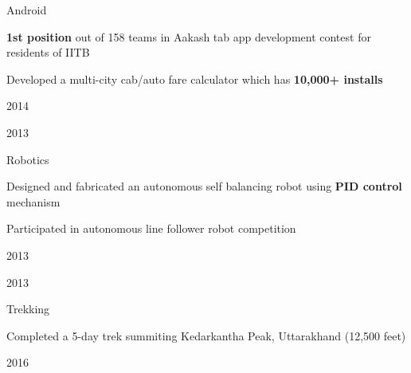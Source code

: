 \begin{fancyextracurrics}
%
%
\fancycurric
{Android}
{ %
\begin{extralistwithbullets}
\item {\textbf{1st position} out of 158 teams in Aakash tab app development contest for residents of IITB}
\item {Developed a multi-city cab/auto fare calculator which has \textbf{10,000+ installs}}
\end{extralistwithbullets}
}
{ %
\begin{extralistsansbullets}
\item {2014}
\item {2013}
\end{extralistsansbullets}
}
%
%
\fancycurric
{Robotics}
{ %
\begin{extralistwithbullets}
\item {Designed and fabricated an autonomous self balancing robot using \textbf{PID control} mechanism}
\item {Participated in autonomous line follower robot competition}
\end{extralistwithbullets}
}
{ %
\begin{extralistsansbullets}
\item{2013}
\item{2013}
\end{extralistsansbullets}
}
%
%
\fancycurriclast
{Trekking}
{ %
\begin{extralistwithbullets}
    \item {Completed a 5-day trek summiting Kedarkantha Peak, Uttarakhand (12,500 feet)}
\end{extralistwithbullets}
}
{ %
\begin{extralistsansbullets}
    \item{2016}
\end{extralistsansbullets}
}
\end{fancyextracurrics}
